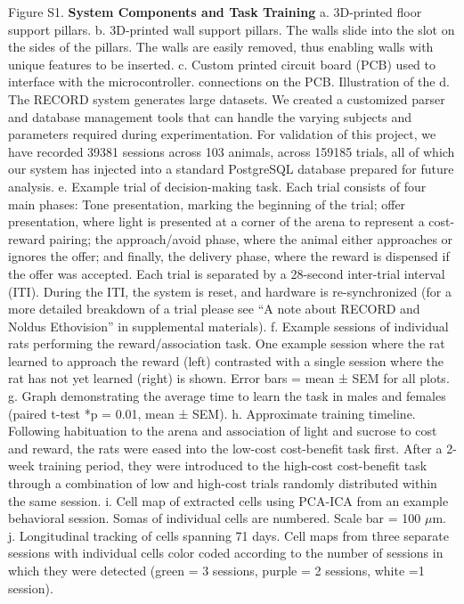 \documentclass{article}
\begin{document}
\begin{singlespace}
\noindent Figure S1. \textbf{System Components and Task Training} a. 3D-printed floor support pillars.
b. 3D-printed wall support pillars. The walls slide into the slot on the sides of the pillars. The walls are easily removed, thus enabling walls with unique features to be inserted.
c. Custom printed circuit board (PCB) used to interface with the microcontroller. connections on the PCB.
Illustration of the
d. The RECORD system generates large datasets. We created a customized parser and
database management tools that can handle the varying subjects and parameters required during
experimentation. For validation of this project, we have recorded 39381 sessions across 103
animals, across 159185 trials, all of which our system has injected into a standard PostgreSQL
database prepared for future analysis.
e. Example trial of decision-making task. Each trial consists of four main phases: Tone
presentation, marking the beginning of the trial; offer presentation, where light is presented at a
corner of the arena to represent a cost-reward pairing; the approach/avoid phase, where the
animal either approaches or ignores the offer; and finally, the delivery phase, where the reward
is dispensed if the offer was accepted. Each trial is separated by a 28-second inter-trial interval
(ITI). During the ITI, the system is reset, and hardware is re-synchronized (for a more detailed
breakdown of a trial please see “A note about RECORD and Noldus Ethovision” in supplemental
materials).
f. Example sessions of individual rats performing the reward/association task. One example
session where the rat learned to approach the reward (left) contrasted with a single session where
the rat has not yet learned (right) is shown. Error bars = mean ± SEM for all plots.
g. Graph demonstrating the average time to learn the task in males and females (paired t-test *p
= 0.01, mean ± SEM).
h. Approximate training timeline. Following habituation to the arena and association of light and
sucrose to cost and reward, the rats were eased into the low-cost cost-benefit task first. After a
2-week training period, they were introduced to the high-cost cost-benefit task through a
combination of low and high-cost trials randomly distributed within the same session.
i. Cell map of extracted cells using PCA-ICA from an example behavioral session. Somas of
individual cells are numbered. Scale bar = 100 $\mu$m.
j. Longitudinal tracking of cells spanning 71 days. Cell maps from three separate sessions with
individual cells color coded according to the number of sessions in which they were detected
(green = 3 sessions, purple = 2 sessions, white =1 session).
\end{singlespace} 
\end{document}
